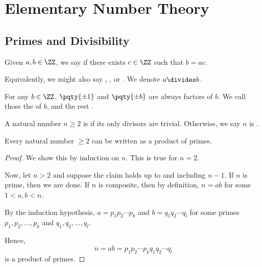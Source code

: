 \section{Elementary Number Theory}
\label{sec:elementary-number-theory}

\subsection{Primes and Divisibility}
\label{sec:primes-and-divisibility}

\begin{definition}[Divisors]
    Given \(a, b \in \ZZ\), we say  if there exists \(c \in \ZZ\) such that \(b = ac\).

    Equivalently, we might also say , , or . We denote \(a \divides b\).
\end{definition}

\begin{definition}
    For any \(b \in \ZZ\), \(\pqty{\pm 1}\) and \(\pqty{\pm b}\) are always factors of \(b\). We call those the  of \(b\), and the rest .
\end{definition}

\begin{definition}
    A natural number \(n \geq 2\) is  if its only divisors are trivial. Otherwise, we say \(n\) is .
\end{definition}

\begin{proposition}
    Every natural number \(\geq 2\) can be written as a product of primes.
\end{proposition}

\begin{proof}
    We show this by induction on \(n\). This is true for \(n = 2\).

    Now, let \(n > 2\) and suppose the claim holds up to and including \(n - 1\). If \(n\) is prime, then we are done. If \(n\) is composite, then by definition, \(n = ab\) for some \(1 < a, b < n\).

    By the induction hypothesis, \(a = p_1 p_2 \cdots p_k\) and \(b = q_1 q_2 \cdots q_l\) for some primes \(p_1, p_2, \ldots, p_k\) and \(q_1, q_2, \ldots, q_l\).

    Hence,
    \[
        n = ab = p_1 p_2 \cdots p_k q_1 q_2 \cdots q_l
    \]
    is a product of primes.
\end{proof}

